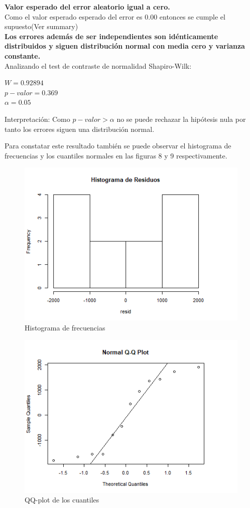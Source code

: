 \documentclass[12pt,a4paper]{article}
\begin{document}
	
	\textbf{Valor esperado del error aleatorio igual a cero.}\\
	Como el valor esperado esperado del error es 0.00 entonces se cumple el supuesto(Ver summary)
	\\
		
	\textbf{Los errores además de ser independientes son idénticamente distribuidos y siguen distribución normal con media cero y varianza constante.}\\
	Analizando el test de contraste de normalidad Shapiro-Wilk:
	\begin{center}
		$W = 0.92894$ \\
		$p-valor = 0.369$\\
		$\alpha = 0.05$
	\end{center}
	Interpretación: Como $p-valor > \alpha$ no se puede rechazar la hipótesis nula por tanto los errores siguen una distribución normal.
	
	Para constatar este resultado también se puede observar el histograma de frecuencias y los cuantiles normales en las figuras 8 y 9 respectivamente.
	
	
	\begin{figure}[!h]
		\centering
		\includegraphics[scale= 0.5]{./images/HR1.png}
		\caption{\small{Histograma de frecuencias  }}
	\end{figure}
	

	\begin{figure}[!h]
		\centering
			\includegraphics[scale= 0.5]{./images/QQPLOT1.png}
		\caption{\small{QQ-plot de los cuantiles  }}
	\end{figure}
\end{document}
